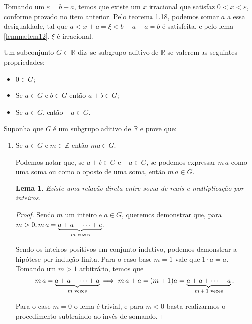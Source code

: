 \documentclass{IMTexam}
\newtheorem{lemma}[theorem]{Lema}
\begin{document}
\begin{questions}
\begin{parts}
			\begin{solution}
				Tomando um $ \varepsilon=b-a $, temos que existe um $ x $ irracional que satisfaz $ 0<x<\varepsilon $, conforme provado no item anterior. Pelo teorema 1.18, podemos somar $ a $ a essa desigualdade, tal que $ a<x+a=\xi<b-a+a=b $ é satisfeita, e pelo lema \ref{lemma:lem12}, $ \xi $ é irracional.
				
				\hfill\qedsymbol
			\end{solution}
		\end{parts}
		
		 Um subconjunto $ G \subset \mathbb{R} $ diz–se subgrupo aditivo de $\mathbb{R}$ se valerem as seguintes propriedades:
		\begin{itemize}
			\item $ 0 \in G $;
			\item Se $ a\in G $ e $ b\in G $ então $ a+b\in G $;
			\item Se $ a\in G $, então $ -a\in G $.
		\end{itemize}
		Suponha que $ G $ é um subgrupo aditivo de $\mathbb{R}$ e prove que:
		\begin{enumerate}[label=(\roman*)]
			\item Se $ a \in G $ e $ m \in \mathbb{Z} $ então $ ma \in G $.
			
			\begin{solution}
				Podemos notar que, se $ a+b\in G $ e $ -a\in G $, se podemos expressar $ m\,a $ como uma soma ou como o oposto de uma soma, então $ m\,a\in G $.
				
				\begin{lemma}
					Existe uma relação direta entre soma de reais e multiplicação por inteiros.
				\end{lemma}
			
				\begin{proof}
					Sendo $ m $ um inteiro e $ a\in G $, queremos demonstrar que, para $ m>0, m\,a=\underbrace{a+a+\cdots+a}_{\textup{$ m $ vezes}} $. %
					
					Sendo os inteiros positivos um conjunto indutivo, podemos demonstrar a hipótese por indução finita. Para o caso base $ m=1 $ vale que $ 1\cdot a=a $. Tomando um $ m>1 $ arbitrário, temos que
					\[ m\,a=\underbrace{a+a+\cdots+a}_{\textup{$ m $ vezes}}\implies m\,a+a=(m+1)a=\underbrace{a+a+\cdots+a}_{\textup{$ m+1 $ vezes}}. \]
					
					Para o caso $ m=0 $ o lema é trivial, e para $ m<0 $ basta realizarmos o procedimento subtraindo ao invés de somando.
				\end{proof}
			

\end{solution}
\end{enumerate}
\end{questions}
\end{document}
